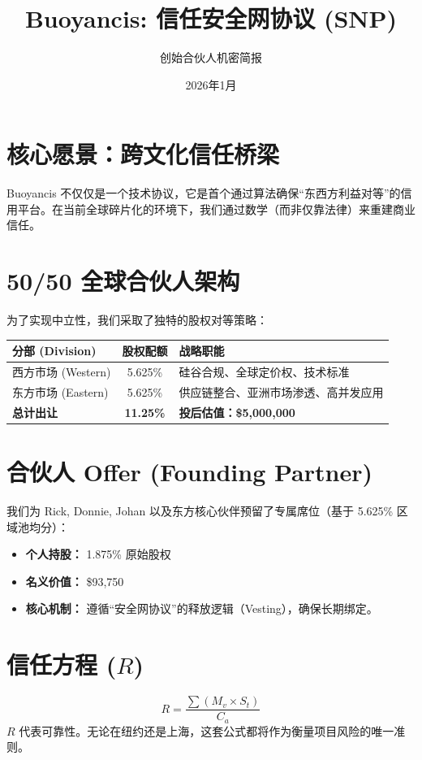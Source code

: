 \documentclass[11pt]{article}
\title{\textbf{Buoyancis: 信任安全网协议 (SNP)}}
\author{创始合伙人机密简报}
\date{2026年1月}
\begin{document}
\maketitle

\section{核心愿景：跨文化信任桥梁}
Buoyancis 不仅仅是一个技术协议，它是首个通过算法确保“东西方利益对等”的信用平台。在当前全球碎片化的环境下，我们通过数学（而非仅靠法律）来重建商业信任。

\section{50/50 全球合伙人架构}
为了实现中立性，我们采取了独特的股权对等策略：

\begin{center}
\renewcommand{\arraystretch}{1.3}
\begin{tabular}{lcp{6cm}}
    \toprule
    \textbf{分部 (Division)} & \textbf{股权配额} & \textbf{战略职能} \\
    \midrule
    西方市场 (Western) & 5.625\% & 硅谷合规、全球定价权、技术标准 \\
    东方市场 (Eastern) & 5.625\% & 供应链整合、亚洲市场渗透、高并发应用 \\
    \midrule
    \textbf{总计出让} & \textbf{11.25\%} & \textbf{投后估值：\$5,000,000} \\
    \bottomrule
\end{tabular}
\end{center}

\section{合伙人 Offer (Founding Partner)}
我们为 Rick, Donnie, Johan 以及东方核心伙伴预留了专属席位（基于 5.625\% 区域池均分）：
\begin{itemize}
    \item \textbf{个人持股：} 1.875\% 原始股权
    \item \textbf{名义价值：} \$93,750
    \item \textbf{核心机制：} 遵循“安全网协议”的释放逻辑（Vesting），确保长期绑定。
\end{itemize}

\section{信任方程 ($R$)}
\[ R = \frac{\sum (M_{v} \times S_{t})}{C_{a}} \]
$R$ 代表可靠性。无论在纽约还是上海，这套公式都将作为衡量项目风险的唯一准则。
\end{document}
